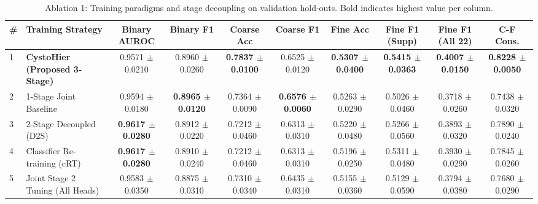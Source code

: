 \documentclass[runningheads]{llncs}
\begin{document}
\begin{table}[t]
\centering
\caption{Ablation 1: Training paradigms and stage decoupling on validation hold-outs. Bold indicates highest value per column.}
\label{tab:ablation_training_paradigm}
\begin{adjustbox}{max width=\textwidth}
\begin{tabular}{llcccccccc}
\toprule
\textbf{\#} & \textbf{Training Strategy} & \textbf{Binary AUROC} & \textbf{Binary F1} & \textbf{Coarse Acc} & \textbf{Coarse F1} & \textbf{Fine Acc} & \textbf{Fine F1 (Supp)} & \textbf{Fine F1 (All 22)} & \textbf{C-F Cons.} \\
\midrule
1 & \textbf{CystoHier (Proposed 3-Stage)} & 0.9571 $\pm$ 0.0210 & 0.8960 $\pm$ 0.0260 & \textbf{0.7837 $\pm$ 0.0100} & 0.6525 $\pm$ 0.0120 & \textbf{0.5307 $\pm$ 0.0400} & \textbf{0.5415 $\pm$ 0.0363} & \textbf{0.4007 $\pm$ 0.0150} & \textbf{0.8228 $\pm$ 0.0050} \\
2 & 1-Stage Joint Baseline & 0.9594 $\pm$ 0.0180 & \textbf{0.8965 $\pm$ 0.0120} & 0.7364 $\pm$ 0.0090 & \textbf{0.6576 $\pm$ 0.0060} & 0.5263 $\pm$ 0.0290 & 0.5026 $\pm$ 0.0460 & 0.3718 $\pm$ 0.0260 & 0.7438 $\pm$ 0.0320 \\
3 & 2-Stage Decoupled (D2S) & \textbf{0.9617 $\pm$ 0.0280} & 0.8912 $\pm$ 0.0220 & 0.7212 $\pm$ 0.0460 & 0.6313 $\pm$ 0.0310 & 0.5220 $\pm$ 0.0480 & 0.5266 $\pm$ 0.0560 & 0.3893 $\pm$ 0.0320 & 0.7890 $\pm$ 0.0240 \\
4 & Classifier Re-training (cRT) & \textbf{0.9617 $\pm$ 0.0280} & 0.8910 $\pm$ 0.0240 & 0.7212 $\pm$ 0.0460 & 0.6313 $\pm$ 0.0310 & 0.5196 $\pm$ 0.0250 & 0.5311 $\pm$ 0.0480 & 0.3930 $\pm$ 0.0290 & 0.7845 $\pm$ 0.0260 \\
5 & Joint Stage 2 Tuning (All Heads) & 0.9583 $\pm$ 0.0350 & 0.8875 $\pm$ 0.0310 & 0.7310 $\pm$ 0.0340 & 0.6435 $\pm$ 0.0310 & 0.5155 $\pm$ 0.0360 & 0.5129 $\pm$ 0.0590 & 0.3794 $\pm$ 0.0380 & 0.7680 $\pm$ 0.0290 \\
\bottomrule
\end{tabular}
\end{adjustbox}
\end{table}
\end{document}
